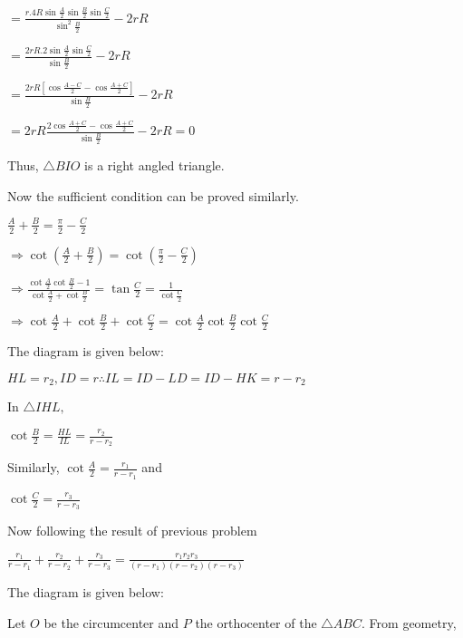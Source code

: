   $= \frac{r.4R\sin\frac{A}{2}\sin\frac{B}{2}\sin\frac{C}{2}}{\sin^2\frac{B}{2}} - 2rR$

  $= \frac{2rR.2\sin\frac{A}{2}\sin\frac{C}{2}}{\sin\frac{B}{2}} - 2rR$

  $= \frac{2rR\left[\cos\frac{A - C}{2} - \cos\frac{A + C}{2}\right]}{\sin\frac{B}{2}} - 2rR$

  $= 2rR\frac{2\cos\frac{A + C}{2}- \cos\frac{A + C}{2}}{\sin\frac{B}{2}} - 2rR = 0$

  Thus, $\triangle BIO$ is a right angled triangle.

  Now the sufficient condition can be proved similarly.

\item $\frac{A}{2} + \frac{B}{2} = \frac{\pi}{2} - \frac{C}{2}$

  $\Rightarrow \cot\left(\frac{A}{2} + \frac{B}{2}\right) = \cot\left(\frac{\pi}{2} - \frac{C}{2}\right)$

  $\Rightarrow \frac{\cot\frac{A}{2}\cot\frac{B}{2} - 1}{\cot\frac{A}{2} + \cot\frac{B}{2}} = \tan\frac{C}{2} =
  \frac{1}{\cot\frac{C}{2}}$

  $\Rightarrow \cot\frac{A}{2} + \cot \frac{B}{2} + \cot\frac{C}{2} = \cot\frac{A}{2}\cot\frac{B}{2}\cot\frac{C}{2}$

\item The diagram is given below:

  \startplacefigure
    \externalfigure[21_2.pdf]
  \stopplacefigure

  $HL = r_2, ID=r \therefore IL = ID - LD = ID - HK = r - r_2$

  In $\triangle IHL,$

  $\cot\frac{B}{2} = \frac{HL}{IL} = \frac{r_2}{r - r_2}$

  Similarly, $\cot\frac{A}{2} = \frac{r_1}{r - r_1}$ and

  $\cot\frac{C}{2} = \frac{r_3}{r - r_3}$

  Now following the result of previous problem

  $\frac{r_1}{r - r_1} + \frac{r_2}{r - r_2} + \frac{r_3}{r - r_3} = \frac{r_1r_2r_3}{(r - r_1)(r - r_2)(r - r_3)}$

\item The diagram is given below:

  \startplacefigure
    \externalfigure[21_3.pdf]
  \stopplacefigure

  Let $O$ be the circumcenter and $P$ the orthocenter of the $\triangle ABC.$ From geometry,

